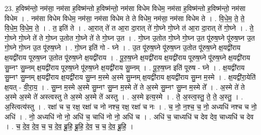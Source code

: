 \documentclass[17pt]{extarticle}
\begin{document}
23. ह॒विष्म॑न्तो॒ नम॑सा॒ नम॑सा ह॒विष्म॑न्तो ह॒विष्म॑न्तो॒ नम॑सा विधेम विधेम॒ नम॑सा ह॒विष्म॑न्तो ह॒विष्म॑न्तो॒ नम॑सा विधेम । . नम॑सा विधेम विधेम॒ नम॑सा॒ नम॑सा विधेम ते ते विधेम॒ नम॑सा॒ नम॑सा विधेम ते । . वि॒धे॒म॒ ते॒ ते॒ वि॒धे॒म॒ वि॒धे॒म॒ ते॒ । . त॒ इति॑ ते । . आ॒रात् ते॑ त आ॒रा दा॒रात् ते॑ गो॒घ्ने गो॒घ्ने त॑ आ॒रा दा॒रात् ते॑ गो॒घ्ने । . ते॒ गो॒घ्ने गो॒घ्ने ते॑ ते गो॒घ्न उ॒तोत गो॒घ्ने ते॑ ते गो॒घ्न उ॒त । . गो॒घ्न उ॒तोत गो॒घ्ने गो॒घ्न उ॒त पू॑रुष॒घ्ने पू॑रुष॒घ्न उ॒त गो॒घ्ने गो॒घ्न उ॒त पू॑रुष॒घ्ने । . गो॒घ्न इति॑ गो - घ्ने । . उ॒त पू॑रुष॒घ्ने पू॑रुष॒घ्न उ॒तोत पू॑रुष॒घ्ने क्ष॒यद्वी॑राय क्ष॒यद्वी॑राय पूरुष॒घ्न उ॒तोत पू॑रुष॒घ्ने क्ष॒यद्वी॑राय । . पू॒रु॒ष॒घ्ने क्ष॒यद्वी॑राय क्ष॒यद्वी॑राय पूरुष॒घ्ने पू॑रुष॒घ्ने क्ष॒यद्वी॑राय सु॒म्नꣳ सु॒म्नम् क्ष॒यद्वी॑राय पूरुष॒घ्ने पू॑रुष॒घ्ने क्ष॒यद्वी॑राय सु॒म्नम् । . पू॒रु॒ष॒घ्न इति॑ पूरुष - घ्ने । . क्ष॒यद्वी॑राय सु॒म्नꣳ सु॒म्नम् क्ष॒यद्वी॑राय क्ष॒यद्वी॑राय सु॒म्न म॒स्मे अ॒स्मे सु॒म्नम् क्ष॒यद्वी॑राय क्ष॒यद्वी॑राय सु॒म्न म॒स्मे । . क्ष॒यद्वी॑रा॒येति॑ क्ष॒यत् - वी॒रा॒य॒ । . सु॒म्न म॒स्मे अ॒स्मे सु॒म्नꣳ सु॒म्न म॒स्मे ते॑ ते अ॒स्मे सु॒म्नꣳ सु॒म्न म॒स्मे ते᳚ । . अ॒स्मे ते॑ ते अ॒स्मे अ॒स्मे ते॑ अस्त्वस्तु ते अ॒स्मे अ॒स्मे ते॑ अस्तु । . अ॒स्मे इत्य॒स्मे । . ते॒ अ॒स्त्व॒स्तु॒ ते॒ ते॒ अ॒स्तु॒ । . अ॒स्त्वित्य॑स्तु । . रक्षा॑ च च॒ रक्ष॒ रक्षा॑ च नो नश्च॒ रक्ष॒ रक्षा॑ च नः । . च॒ नो॒ न॒श्च॒ च॒ नो॒ अध्यधि॑ नश्च च नो॒ अधि॑ । . नो॒ अध्यधि॑ नो नो॒ अधि॑ च॒ चाधि॑ नो नो॒ अधि॑ च । . अधि॑ च॒ चाध्यधि॑ च देव देव॒ चाध्यधि॑ च देव । . च॒ दे॒व॒ दे॒व॒ च॒ च॒ दे॒व॒ ब्रू॒हि॒ ब्रू॒हि॒ दे॒व॒ च॒ च॒ दे॒व॒ ब्रू॒हि॒ । \newline
\end{document}
